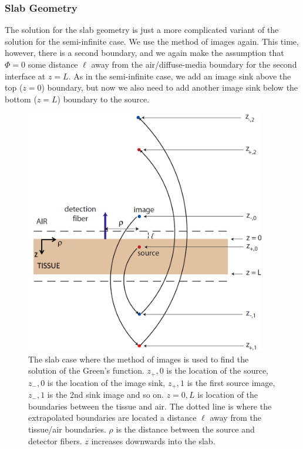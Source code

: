 \subsubsection{Slab Geometry}
The solution for the slab geometry is just a more complicated variant of the solution for the semi-infinite case. We use the method of images again. This time, however, there is a second boundary, and we again make the assumption that $\Phi=0$ some distance $\ell$ away from the air/diffuse-media boundary for the second interface at $z=L$. As in the semi-infinite case, we add an image sink above the top ($z=0$) boundary, but now we also need to add another image sink below the bottom ($z=L$) boundary to the source.
\begin{figure}[h]
\begin{center}
\includegraphics[width=10.5cm]{./figures/2_Theory/slab.png}
\caption[Diagram of the slab case]{The slab case where the method of images is used to find the solution of the Green's function. $z_+,0$ is the location of the source, $z_-,0$ is the location of the image sink, $z_+,1$ is the first source image, $z_-,1$ is the 2nd sink image and so on. $z=0,L$ is location of the boundaries between the tissue and air. The dotted line is where the extrapolated boundaries are located a distance $\ell$ away from the tissue/air boundaries. $\rho$ is the distance between the source and detector fibers. $z$ increases downwards into the slab.}
\label{fig:slab}
\end{center}
\end{figure}

